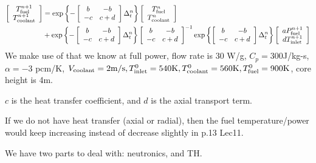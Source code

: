 \documentclass{school-22.211-notes}
\begin{document}
\begin{align}
 \left[ \begin{array}{c} T_{\mathrm{fuel}}^{n+1} \\ T_{\mathrm{coolant}}^{n+1} \end{array} \right]
&= \exp \left\{ -  \left[ \begin{array}{cc} b & -b \\ -c & c+d \end{array} \right] \Delta_t^n \right\}
\left[ \begin{array}{c} T_{\mathrm{fuel}}^n \\ T_{\mathrm{coolant}}^n \end{array} \right] \notag \\
&+ \exp \left\{ -  \left[ \begin{array}{cc} b & -b \\ -c & c+d \end{array} \right] \Delta_t^n \right\}
\left[ \begin{array}{cc} b & -b \\ -c & c+d \end{array} \right]^{-1}
\exp \left\{ \left[ \begin{array}{cc} b & -b \\ -c & c+d \end{array} \right] \Delta_t^n \right\}
\left[ \begin{array}{c} a P_{\mathrm{fuel}}^{n+1} \\ d T_{\mathrm{inlet}}^{n+1} \end{array} \right] \label{TH-analytical}
\end{align}
We make use of that we know at full power,  flow rate is 30 W/g, $C_p = 300$J/kg-s, $\alpha = -3$ pcm/K, $V_{\mathrm{coolant}} = 2 \mathrm{m}/\mathrm{s}, T_{\mathrm{inlet}}^0 = 540 \mathrm{K}, T_{\mathrm{coolant}}^0 = 560 \mathrm{K}, T_{\mathrm{fuel}}^0 = 900 \mathrm{K}$, core height is 4m. 

$c$ is the heat transfer coefficient, and $d$ is the axial transport term. 

If we do not have heat transfer (axial or radial), then the fuel temperature/power would keep increasing instead of decrease slightly in p.13 Lec11. 


\clearpage
{}
We have two parts to deal with: neutronics, and TH. 
\end{document}
